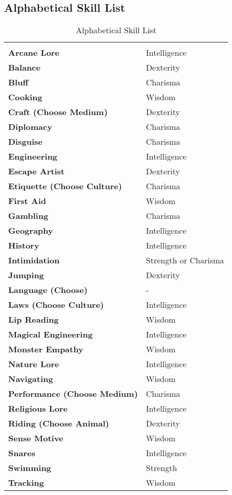 \begin{multicols*}{2}
\section{Alphabetical Skill List}
\begin {table}[H]
  \caption{Alphabetical Skill List}
  \begin{tabularx}{\columnwidth}{>{\bfseries}YY}
	 & \\
	Arcane Lore & Intelligence\\
	Balance & Dexterity\\
	Bluff & Charisma\\
	Cooking & Wisdom\\
	Craft (Choose Medium) & Dexterity\\
	Diplomacy & Charisma\\
	Disguise & Charisma\\
	Engineering & Intelligence\\
	Escape Artist & Dexterity\\
	Etiquette (Choose Culture) & Charisma\\
	First Aid & Wisdom\\
	Gambling & Charisma\\
	Geography & Intelligence\\
	History & Intelligence\\
	Intimidation & Strength or Charisma\\
	Jumping & Dexterity\\
	Language (Choose) & -\\
	Laws (Choose Culture) & Intelligence\\
	Lip Reading & Wisdom\\
	Magical Engineering & Intelligence\\
	Monster Empathy & Wisdom\\
	Nature Lore & Intelligence\\
	Navigating & Wisdom\\
	Performance (Choose Medium) & Charisma\\
	Religious Lore & Intelligence\\
	Riding (Choose Animal) & Dexterity\\
	Sense Motive & Wisdom\\
	Snares & Intelligence\\
	Swimming & Strength\\
	Tracking & Wisdom
  \end {tabularx}
\end {table}


\end{multicols*}
